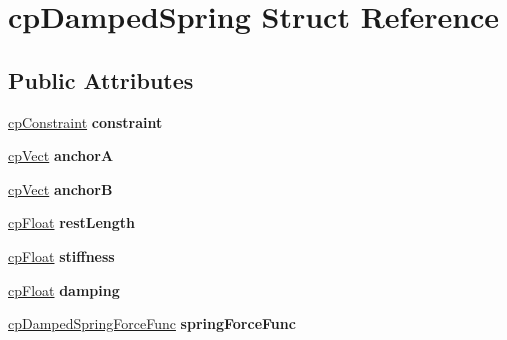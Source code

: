 \hypertarget{structcp_damped_spring}{}\section{cp\+Damped\+Spring Struct Reference}
\label{structcp_damped_spring}
\subsection*{Public Attributes}
\begin{DoxyCompactItemize}
\item 
\mbox{\label{structcp_damped_spring_aa24b79f6ccfa5b0891fe3092752888be}} 
\mbox{\hyperlink{structcp_constraint}{cp\+Constraint}} {\bfseries constraint}
\item 
\mbox{\label{structcp_damped_spring_afda1e8a59f2cd95c3faaa9411d252e9d}} 
\mbox{\hyperlink{structcp_vect}{cp\+Vect}} {\bfseries anchorA}
\item 
\mbox{\label{structcp_damped_spring_a9c8f67e034e3c83b348d32ba2f4f0025}} 
\mbox{\hyperlink{structcp_vect}{cp\+Vect}} {\bfseries anchorB}
\item 
\mbox{\label{structcp_damped_spring_ab61ca07cbe0ddd6f4379eb1fe364fa8b}} 
\mbox{\hyperlink{group__basic_types_gac1ed65573e035bf892505768c852d8d3}{cp\+Float}} {\bfseries rest\+Length}
\item 
\mbox{\label{structcp_damped_spring_a6d40b21dc0ca0a57aecec6c517850f5f}} 
\mbox{\hyperlink{group__basic_types_gac1ed65573e035bf892505768c852d8d3}{cp\+Float}} {\bfseries stiffness}
\item 
\mbox{\label{structcp_damped_spring_ac337d660f55f223ab0a1171ae630a0f2}} 
\mbox{\hyperlink{group__basic_types_gac1ed65573e035bf892505768c852d8d3}{cp\+Float}} {\bfseries damping}
\item 
\mbox{\label{structcp_damped_spring_aa60f86823b89c951e6dff6defc3b5692}} 
\mbox{\hyperlink{group__cp_damped_spring_gad88d8466e0057d4ad05183fb14fa274d}{cp\+Damped\+Spring\+Force\+Func}} {\bfseries spring\+Force\+Func}
\item 

\end{DoxyCompactItemize}
